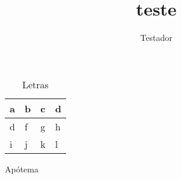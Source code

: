 \documentclass[a4paper,12pt]{article}
\title{teste}
\author{Testador}
\begin{document}
\maketitle
\section{}
\begin{table}[ht!]
{\huge\caption{Letras}}
\centering
\begin{tabular}{p{2.0cm} p{2.0cm}|||p{2.0cm} p{6.0cm}}
\hline
a & b & c & d \\ \hline
d & f & g & h \\ \hline
i & j & k & l \\ \hline \hline
\end{tabular}
\end{table}


Apótema




\begin{abstract}

\end{abstract}
\end{document}
